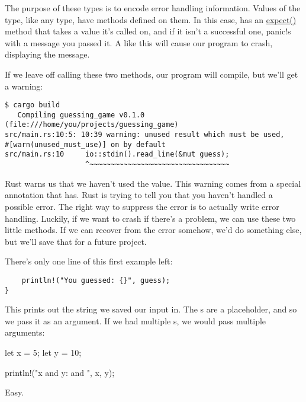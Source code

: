 \blank

The purpose of these  types is to encode error handling information. Values of the  type, like any 
type, have methods defined on them. In this case,  has an 
\href{https://doc.rust-lang.org/std/option/enum.Option.html\#method.expect}{expect()} method that takes a value it’s called on, 
and if it isn’t a successful one, panic!s with a message you passed it. A  like this will cause our program to crash,
displaying the message.

\blank

If we leave off calling these two methods, our program will compile, but we’ll get a warning:

\begin{verbatim}
$ cargo build
   Compiling guessing_game v0.1.0 (file:///home/you/projects/guessing_game)
src/main.rs:10:5: 10:39 warning: unused result which must be used,
#[warn(unused_must_use)] on by default
src/main.rs:10     io::stdin().read_line(&mut guess);
                   ^~~~~~~~~~~~~~~~~~~~~~~~~~~~~~~~~~
\end{verbatim}

Rust warns us that we haven’t used the  value. This warning comes from a special annotation that 
 has. Rust is trying to tell you that you haven’t handled a possible error. The right way to suppress 
the error is to actually write error handling. Luckily, if we want to crash if there’s a problem, we can use these two 
little methods. If we can recover from the error somehow, we’d do something else, but we’ll save that for a future project.

\blank

There’s only one line of this first example left:

\begin{verbatim}
    println!("You guessed: {}", guess);
} 
\end{verbatim}

This prints out the string we saved our input in. The \code{\{\}}s are a placeholder, and so we pass it  as an 
argument. If we had multiple \code{\{\}}s, we would pass multiple arguments:

\begin{rustc}
let x = 5;
let y = 10;

println!("x and y: {} and {}", x, y);
\end{rustc}

Easy.

